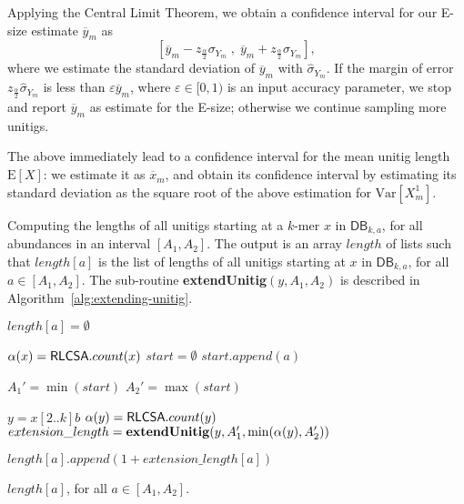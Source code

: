 \documentclass[a4paper,11pt]{article}
\newcommand{\DB}{\mathsf{DB}_{k,a}}
\newcommand{\abu}{\alpha}
\newcommand{\isstart}{{\sf isStart}_{k,a}}
\newcommand{\RLCSA}{{\sf RLCSA}}
\renewcommand{\leq}{\leqslant}
\newcommand{\Var}{\text{Var}}
\newcommand{\E}{\text{E}}
\begin{document}
Applying the Central Limit Theorem, we obtain a confidence interval for our E-size estimate $\overline{y}_m$ as 
\[\left[\overline{y}_m - z_{\frac{\alpha}{2}}\sigma_{Y_m} \;,\; \overline{y}_m + z_{\frac{\alpha}{2}}\sigma_{Y_m}\right], \]
where we estimate the standard deviation of $\overline{y}_m$ with $\hat{\sigma}_{Y_m}$. If the margin of error $z_{\frac{\alpha}{2}}\hat{\sigma}_{Y_m}$ is less than $\varepsilon \overline{y}_m$, where $\varepsilon \in [0,1)$ is an input accuracy parameter, we stop and report $\overline{y}_m$ as estimate for the E-size; otherwise we continue sampling more unitigs.

The above immediately lead to a confidence interval for the mean unitig length $\E[X]$: we estimate it as $\overline{x}_m$, and obtain its confidence interval by estimating its standard deviation as the square root of the above estimation for $\Var[X^1_m]$.


\begin{algorithm}[t]
\caption{Computing the lengths of all unitigs starting at a $k$-mer $x$ in $\DB$, for all abundances in an interval $[A_1,A_2]$. The output is an array $length$ of lists such that $length[a]$ is the list of lengths of all unitigs starting at $x$ in $\DB$, for all $a \in [A_1,A_2]$. The sub-routine {\bf extendUnitig}$(y,A_1,A_2)$ is described in Algorithm~\ref{alg:extending-unitig}.\label{alg:sampling-for-esize}}


{
	$length[a] = \emptyset$\;
}

$\abu(x) = \RLCSA.count(x)$\;
$start = \emptyset$\;
{
	\If{$\isstart(x)$ {\bf and} $a \leq \abu(x)$}
	{
		$start.append(a)$\;
	}
}
{
	$A_1' = \min(start)$\;
	$A_2' = \max(start)$\;

    {
    	$y = x[2..k]b$\;
    	$\abu(y) = \RLCSA.count(y)$\;
    	$extension\_length = {\bf extendUnitig}(y,A_1', \min(\abu(y),A_2'))$\;
	
    	{
			\If{$a \leq \min(\abu(y),A_2')$}
			{
				$length[a].append(1 + extension\_length[a])$
			}
			
    		
    	}
    }
}
\Return $length[a]$, for all $a \in [A_1,A_2]$.
\end{algorithm}
\end{document}
